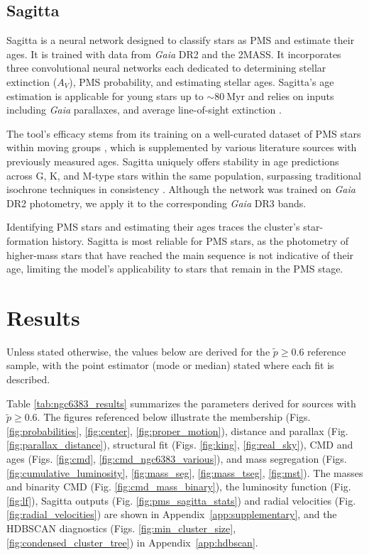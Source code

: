 \documentclass{aa}
\begin{document}
\subsection{Sagitta}
Sagitta is a neural network designed to classify stars as PMS and estimate their ages. It is trained with data from \textit{Gaia} DR2 and the 2MASS. It incorporates three convolutional neural networks each dedicated to determining stellar extinction ($A_V$), PMS probability, and estimating stellar ages. Sagitta's age estimation is applicable for young stars up to $\sim 80~\mathrm{Myr}$ and relies on inputs including \textit{Gaia} parallaxes, and average line-of-sight extinction \citep{2021AJ....162..282M}.

The tool's efficacy stems from its training on a well-curated dataset of PMS stars within moving groups \citep{2020AJ....160..279K}, which is supplemented by various literature sources with previously measured ages. Sagitta uniquely offers stability in age predictions across G, K, and M-type stars within the same population, surpassing traditional isochrone techniques in consistency \citep{2023AJ....165..182K}. Although the network was trained on \textit{Gaia} DR2 photometry, we apply it to the corresponding \textit{Gaia} DR3 bands.

Identifying PMS stars and estimating their ages traces the cluster's star-formation history. Sagitta is most reliable for PMS stars, as the photometry of higher-mass stars that have reached the main sequence is not indicative of their age, limiting the model's applicability to stars that remain in the PMS stage.

\section{Results}\label{sec:results}
Unless stated otherwise, the values below are derived for the $\tilde{p}\geq0.6$ reference sample, with the point estimator (mode or median) stated where each fit is described.

Table \ref{tab:ngc6383_results} summarizes the parameters derived for sources with $\tilde{p}\geq0.6$. The figures referenced below illustrate the membership (Figs. \ref{fig:probabilities}, \ref{fig:center}, \ref{fig:proper_motion}), distance and parallax (Fig. \ref{fig:parallax_distance}), structural fit (Figs. \ref{fig:king}, \ref{fig:real_sky}), CMD and ages (Figs. \ref{fig:cmd}, \ref{fig:cmd_ngc6383_various}), and mass segregation (Figs. \ref{fig:cumulative_luminosity}, \ref{fig:mass_seg}, \ref{fig:mass_tseg}, \ref{fig:mst}). The masses and binarity CMD (Fig. \ref{fig:cmd_mass_binary}), the luminosity function (Fig. \ref{fig:lf}), Sagitta outputs (Fig. \ref{fig:pms_sagitta_stats}) and radial velocities (Fig. \ref{fig:radial_velocities}) are shown in Appendix~\ref{app:supplementary}, and the HDBSCAN diagnostics (Figs. \ref{fig:min_cluster_size}, \ref{fig:condensed_cluster_tree}) in Appendix~\ref{app:hdbscan}.
\end{document}
